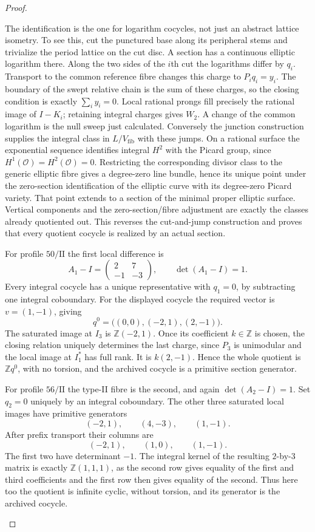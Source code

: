 \begin{proof}
\begin{enumerate}[label=\arabic*.,leftmargin=*]
The identification is the one for logarithm cocycles, not just
an abstract lattice isometry.  To see this, cut the punctured
base along its peripheral stems and trivialize the period
lattice on the cut disc.  A section has a continuous elliptic
logarithm there.  Along the two sides of the $i$th cut the
logarithms differ by $q_i$.  Transport to the common reference
fibre changes this charge to $P_iq_i=y_i$.  The boundary of
the swept relative chain is the sum of these charges, so the
closing condition is exactly $\sum_i y_i=0$.  Local rational
prongs fill precisely the rational image of $I-K_i$; retaining
integral charges gives $W_2$.  A change of the common logarithm
is the null sweep just calculated.  Conversely the junction
construction supplies the integral class in $L/V_{\mathrm{fib}}$
with these jumps.  On a rational surface the exponential
sequence identifies integral $H^2$ with the Picard group,
since $H^1(\mathcal O)=H^2(\mathcal O)=0$.  Restricting the
corresponding divisor class to the generic elliptic fibre
gives a degree-zero line bundle, hence its unique point under
the zero-section identification of the elliptic curve with
its degree-zero Picard variety.  That point extends to a
section of the minimal proper elliptic surface.  Vertical
components and the zero-section/fibre adjustment are exactly
the classes already quotiented out.  This reverses the
cut-and-jump construction and proves that every quotient
cocycle is realized by an actual section.

For profile $50/\mathrm{II}$ the first local difference is
\[
 A_1-I=\begin{pmatrix}2&7\\-1&-3\end{pmatrix},\qquad
 \det(A_1-I)=1.
\]
Every integral cocycle has a unique representative with
$q_1=0$, by subtracting one integral coboundary.  For the
displayed cocycle the required vector is $v=(1,-1)$, giving
\[
 q^0=\bigl((0,0),(-2,1),(2,-1)\bigr).
\]
The saturated image at $I_3$ is
$\mathbb Z(-2,1)$.  Once its coefficient $k\in\mathbb Z$
is chosen, the closing relation uniquely determines the
last charge, since $P_3$ is unimodular and the local image
at $I_1^*$ has full rank.  It is $k(2,-1)$.  Hence the
whole quotient is $\mathbb Zq^0$, with no torsion, and the
archived cocycle is a primitive section generator.

For profile $56/\mathrm{II}$ the type-II fibre is the second,
and again $\det(A_2-I)=1$.  Set $q_2=0$ uniquely by an
integral coboundary.  The other three saturated local images
have primitive generators
\[
 (-2,1),\qquad(4,-3),\qquad(1,-1).
\]
After prefix transport their columns are
\[
 (-2,1),\qquad(1,0),\qquad(1,-1).
\]
The first two have determinant $-1$.  The integral kernel
of the resulting $2$-by-$3$ matrix is exactly
$\mathbb Z(1,1,1)$, as the second row gives equality of the
first and third coefficients and the first row then gives
equality of the second.  Thus here too the quotient is
infinite cyclic, without torsion, and its generator is the
archived cocycle.


\end{enumerate}
\end{proof}
